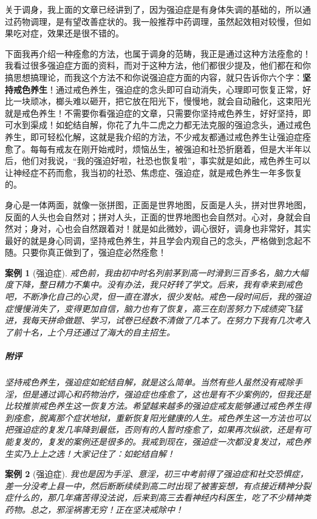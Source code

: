 \documentclass{ctexart}
\newtheorem{case}{案例}
\begin{document}
关于调身，我上面的文章已经讲到了，因为强迫症是有身体失调的基础的，所以通过药物调理，是有望改善症状的。我一般推荐中药调理，虽然起效相对较慢，但如果吃对症，效果还是很不错的。

下面我再介绍一种痊愈的方法，也属于调身的范畴，我正是通过这种方法痊愈的！我看过很多强迫症方面的资料，而对于这种方法，他们都很少提及，他们都在和你搞思想搞理论，而我这个方法不和你说强迫症方面的内容，就只告诉你六个字：\textbf{坚持戒色养生}！通过戒色养生，强迫症的念头即可自动消失，心理即可恢复正常，好比一块顽冰，榔头难以砸开，把它放在阳光下，慢慢地，就会自动融化，这束阳光就是戒色养生！不需要你看强迫症的文章，只需要你坚持戒色养生，好好坚持，即可水到渠成！如蛇结自解，你花了九牛二虎之力都无法克服的强迫念头，通过戒色养生，即可轻松化解，这就是我介绍的方法，不少戒友都通过戒色养生让强迫症痊愈了。每每有戒友在刚开始戒时，烦恼丛生，被强迫和社恐折磨着，但是大半年以后，他们对我说，“我的强迫好啦，社恐也恢复啦”，事实就是如此，戒色养生可以让神经症不药而愈，我当初的社恐、焦虑症、强迫症，就是戒色养生一年多恢复的。

身心是一体两面，就像一张拼图，正面是世界地图，反面是人头，拼对世界地图，反面的人头也会自然对；拼对人头，正面的世界地图也会自然对。心对，身就会自然对；身对，心也会自然跟着对！就是如此微妙，调心很好，调身也非常好，其实最好的就是身心同调，坚持戒色养生，并且学会内观自己的念头，严格做到念起不随。只要你真正做到了，强迫症必然痊愈！

\begin{case}[强迫症]
    戒色前，我由初中时名列前茅到高一时滑到三百多名，脑力大幅度下降，整日精力不集中。没有办法，我只好转了学文。后来，我有幸来到戒色吧，不断净化自己的心灵，但一直在潜水，很少发帖。戒色一段时间后，我的强迫症慢慢消失了，变得更加自信，脑力也有了恢复，高三在刻苦努力下成绩突飞猛进，我每天拼命做题、学习，试卷已经数不清做了几本了。在努力下我有几次考入了前十名，上个月还通过了海大的自主招生。
    \subparagraph{附评} 坚持戒色养生，强迫症如蛇结自解，就是这么简单。当然有些人虽然没有戒除手淫，但是通过调心和药物治疗，强迫症也痊愈了，这也是有不少案例的，但我还是比较推崇戒色养生这一恢复方法。希望越来越多的强迫症戒友能够通过戒色养生得到痊愈，脱离那个症状地狱，重新恢复阳光健康的人生。戒色养生这一方法也可以把强迫症的复发几率降到最低，否则有的人暂时痊愈了，如果再次纵欲，还是有可能复发的，复发的案例还是很多的。我戒到现在，强迫症一次都没复发过，戒色养生实乃上上之选！大家记住了：如蛇结自解！
\end{case}

\begin{case}[强迫症]
    我也是因为手淫、意淫，初三中考前得了强迫症和社交恐惧症，差一分没考上县一中，然后断断续续到高二时出现了被害妄想，有点接近精神分裂症什么的，那几年痛苦得没法说，后来到高三去看神经内科医生，吃了不少精神类药物。总之，邪淫祸害无穷！正在坚决戒除中！
\end{case}
\end{document}
